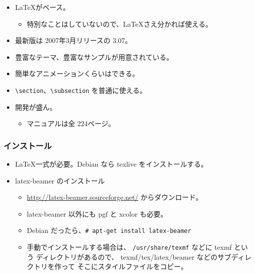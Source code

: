 \documentclass[mingoth,a4paper]{jsarticle}
\begin{document}
\begin{commandline}
\begin{itemize}
\item \LaTeX{}がベース。
  \begin{itemize}
  \item 特別なことはしていないので、\LaTeX{}さえ分かれば使える。
  \end{itemize}
\item 最新版は 2007年3月リリースの 3.07。
\item 豊富なテーマ、豊富なサンプルが用意されている。
\item 簡単なアニメーションくらいはできる。
\item \verb|\section|、\verb|\subsection| を普通に使える。
\item 開発が盛ん。
  \begin{itemize}
  \item マニュアルは全 224ページ。
  \end{itemize}
\end{itemize}

\newpage

\subsubsection{インストール}


\begin{itemize}
\item \LaTeX{}一式が必要。Debian なら texlive をインストールする。
\item latex-beamer のインストール
  \begin{itemize}
  \item \url{http://latex-beamer.sourceforge.net/} からダウンロード。
  \item latex-beamer 以外にも pgf と xcolor も必要。
  \item Debian だったら、\texttt{\# apt-get install latex-beamer}
  \item 手動でインストールする場合は、
    \texttt{/usr/share/texmf} などに texmf という
    ディレクトリがあるので、
    texmf/tex/latex/beamer などのサブディレクトリを作って
    そこにスタイルファイルをコピー。
  \end{itemize}
\end{itemize}



\end{commandline}
\end{document}
